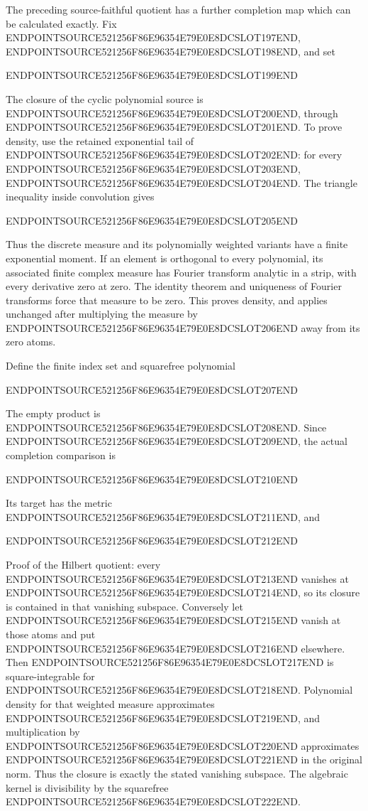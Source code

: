 The preceding source-faithful quotient has a further completion map which can be calculated exactly. Fix ENDPOINTSOURCE521256F86E96354E79E0E8DCSLOT197END, ENDPOINTSOURCE521256F86E96354E79E0E8DCSLOT198END, and set

ENDPOINTSOURCE521256F86E96354E79E0E8DCSLOT199END

The closure of the cyclic polynomial source is ENDPOINTSOURCE521256F86E96354E79E0E8DCSLOT200END, through ENDPOINTSOURCE521256F86E96354E79E0E8DCSLOT201END. To prove density, use the retained exponential tail of ENDPOINTSOURCE521256F86E96354E79E0E8DCSLOT202END: for every ENDPOINTSOURCE521256F86E96354E79E0E8DCSLOT203END, ENDPOINTSOURCE521256F86E96354E79E0E8DCSLOT204END. The triangle inequality inside convolution gives

ENDPOINTSOURCE521256F86E96354E79E0E8DCSLOT205END

Thus the discrete measure and its polynomially weighted variants have a finite exponential moment. If an element is orthogonal to every polynomial, its associated finite complex measure has Fourier transform analytic in a strip, with every derivative zero at zero. The identity theorem and uniqueness of Fourier transforms force that measure to be zero. This proves density, and applies unchanged after multiplying the measure by ENDPOINTSOURCE521256F86E96354E79E0E8DCSLOT206END away from its zero atoms.

Define the finite index set and squarefree polynomial

ENDPOINTSOURCE521256F86E96354E79E0E8DCSLOT207END

The empty product is ENDPOINTSOURCE521256F86E96354E79E0E8DCSLOT208END. Since ENDPOINTSOURCE521256F86E96354E79E0E8DCSLOT209END, the actual completion comparison is

ENDPOINTSOURCE521256F86E96354E79E0E8DCSLOT210END

Its target has the metric ENDPOINTSOURCE521256F86E96354E79E0E8DCSLOT211END, and

ENDPOINTSOURCE521256F86E96354E79E0E8DCSLOT212END

Proof of the Hilbert quotient: every ENDPOINTSOURCE521256F86E96354E79E0E8DCSLOT213END vanishes at ENDPOINTSOURCE521256F86E96354E79E0E8DCSLOT214END, so its closure is contained in that vanishing subspace. Conversely let ENDPOINTSOURCE521256F86E96354E79E0E8DCSLOT215END vanish at those atoms and put ENDPOINTSOURCE521256F86E96354E79E0E8DCSLOT216END elsewhere. Then ENDPOINTSOURCE521256F86E96354E79E0E8DCSLOT217END is square-integrable for ENDPOINTSOURCE521256F86E96354E79E0E8DCSLOT218END. Polynomial density for that weighted measure approximates ENDPOINTSOURCE521256F86E96354E79E0E8DCSLOT219END, and multiplication by ENDPOINTSOURCE521256F86E96354E79E0E8DCSLOT220END approximates ENDPOINTSOURCE521256F86E96354E79E0E8DCSLOT221END in the original norm. Thus the closure is exactly the stated vanishing subspace. The algebraic kernel is divisibility by the squarefree ENDPOINTSOURCE521256F86E96354E79E0E8DCSLOT222END.

